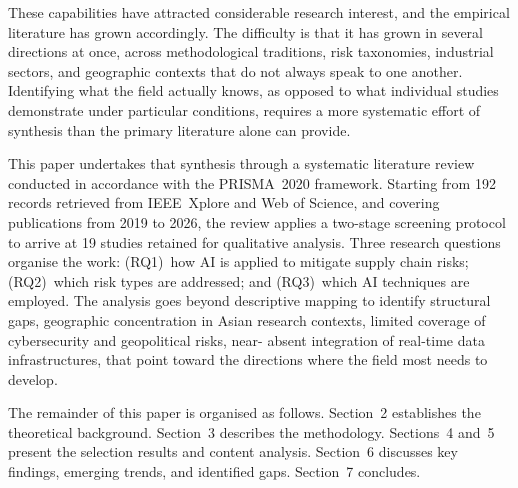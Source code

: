 These capabilities have attracted considerable research interest, and the
empirical literature has grown accordingly. The difficulty is that it has grown
in several directions at once, across methodological traditions, risk
taxonomies, industrial sectors, and geographic contexts that do not always
speak to one another. Identifying what the field actually knows, as opposed
to what individual studies demonstrate under particular conditions, requires
a more systematic effort of synthesis than the primary literature alone can
provide.

This paper undertakes that synthesis through a systematic literature review
conducted in accordance with the PRISMA~2020 framework. Starting from 192
records retrieved from IEEE~Xplore and Web of Science, and covering
publications from 2019 to 2026, the review applies a two-stage screening
protocol to arrive at 19 studies retained for qualitative analysis. Three
research questions organise the work: (RQ1)~how AI is applied to mitigate
supply chain risks; (RQ2)~which risk types are addressed; and (RQ3)~which AI
techniques are employed. The analysis goes beyond descriptive mapping to
identify structural gaps, geographic concentration in Asian research
contexts, limited coverage of cybersecurity and geopolitical risks, near-
absent integration of real-time data infrastructures, that point toward the
directions where the field most needs to develop.

The remainder of this paper is organised as follows. Section~2 establishes
the theoretical background. Section~3 describes the methodology.
Sections~4 and~5 present the selection results and content analysis.
Section~6 discusses key findings, emerging trends, and identified gaps.
Section~7 concludes.